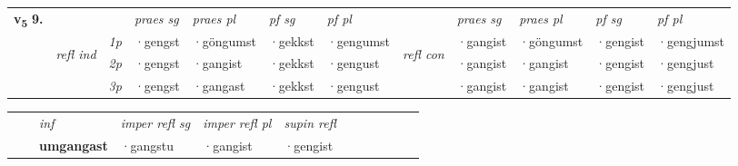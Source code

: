 \begin{tabular}{llllllllllll} \toprule
\multirow{4}{*}{{{\textbf{v{\textsubscript{5}}} \Large{\textbf{9.}}}}}  & &   &  \textit{praes sg}  & \textit{praes pl}  &\textit{pf sg} & \textit{pf pl} &  &  \textit{praes sg}  & \textit{praes pl}  & \textit{pf sg} & \textit{pf pl } \\*
	\cmidrule{4-7} \cmidrule{9-12}
 &\multirow{3}{*}{\begin{turn}{90}\textit{refl ind}\end{turn}} & {\textit{1p}} & ·gengst & ·göngumst    & ·gekkst & ·gengumst & \multirow{3}{*}{\begin{turn}{90}\textit{refl con}\end{turn}}  &·gangist & ·göngumst & ·gengist & ·gengjumst\\*
 &&  {\textit{2p}} &  ·gengst  & ·gangist   & ·gekkst & ·gengust & &·gangist & ·gangist & ·gengist & ·gengjust \\*
& &  {\textit{3p}} & ·gengst & ·gangast   & ·gekkst & ·gengust & & ·gangist & ·gangist& ·gengist & ·gengjust  \\*
\cmidrule{4-7} \cmidrule{9-12}
\end{tabular}


\begin{tabular}{llllllllllll}
 & & \textit{inf}   & \textit{imper refl sg} & \textit{imper refl pl}   & \textit{supin refl}      \\*
  & & \textbf{umgangast}    & ·gangstu & ·gangist   & ·gengist  \\*
\cmidrule{1-12}
\end{tabular}



